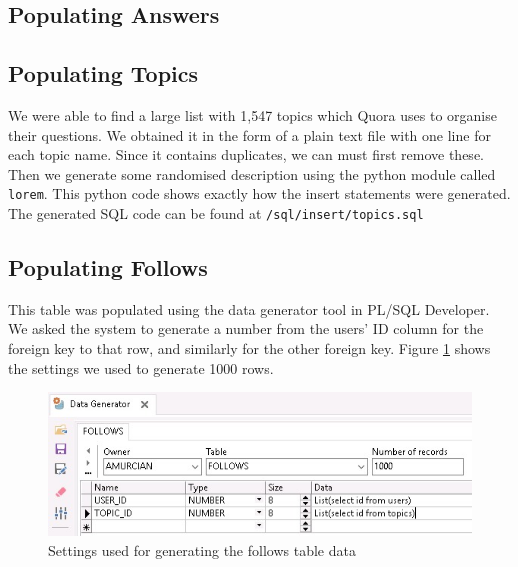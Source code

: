 \subsection{Populating Answers}



\subsection{Populating Topics}

We were able to find a large list with 1,547 topics which Quora uses to organise their questions. We obtained it in the form of a plain text file with one line for each topic name. Since it contains duplicates, we can must first remove these. Then we generate some randomised description using the python module called \verb`lorem`. This python code shows exactly how the insert statements were generated. The generated SQL code can be found at \verb`/sql/insert/topics.sql`


\subsection{Populating Follows}

This table was populated using the data generator tool in PL/SQL Developer. We asked the system to generate a number from the users' ID column for the foreign key to that row, and similarly for the other foreign key. Figure \ref{follows-generator} shows the settings we used to generate 1000 rows.

\begin{figure}[hbp]
	\centering
	\includegraphics[width=\linewidth]{images/follows_generator.jpeg}
	\caption{Settings used for generating the follows table data}
	\label{follows-generator}
\end{figure}